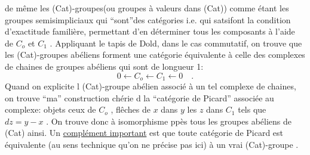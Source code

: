 

de même les (Cat)-groupes(ou groupes à valeurs dans (Cat)) comme étant
les groupes semisimpliciaux qui ``sont''des catégories i.e. qui 
 satsifont la condition d'exactitude familière, permettant d'en déterminer
tous les composants à l'aide de $C_o$ et $C_1$ . Appliquant le tapis de
Dold, dans le cas commutatif, on trouve que les (Cat)-groupes abéliens
forment une catégorie équivalente à celle des complexes de chaines de
groupes abéliens qui sont de longueur 1:
\[
0 \leftarrow C_o \leftarrow C_1 \leftarrow 0 \quad .
\]
Quand on explicite l (Cat)-groupe abélien associé à un tel complexe de
chaines, on trouve ``ma'' construction chérie d la ``catégorie de Picard''
associée au complexe: objets ceux de $C_o$ , flêches de $x$ dans $y$ les $z$ dans $C_1$
tels que $dz=y-x$ . On trouve donc à isomorphisme ppès tous les groupes
abéliens de (Cat) ainsi. Un \uline{complément important} est que toute catégorie
de Picard  est équivalente (au sens technique qu'on ne précise
pas ici) à  un vrai (Cat)-groupe   .

